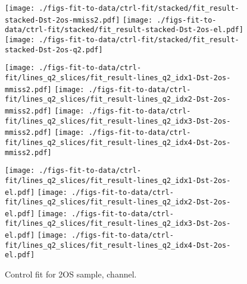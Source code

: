 \begin{figure}[htb]
    \centering
    \texttt{[image: ./figs-fit-to-data/ctrl-fit/stacked/fit\_result-stacked-Dst-2os-mmiss2.pdf]}
    \texttt{[image: ./figs-fit-to-data/ctrl-fit/stacked/fit\_result-stacked-Dst-2os-el.pdf]}
    \texttt{[image: ./figs-fit-to-data/ctrl-fit/stacked/fit\_result-stacked-Dst-2os-q2.pdf]}

    \texttt{[image: ./figs-fit-to-data/ctrl-fit/lines\_q2\_slices/fit\_result-lines\_q2\_idx1-Dst-2os-mmiss2.pdf]}
    \texttt{[image: ./figs-fit-to-data/ctrl-fit/lines\_q2\_slices/fit\_result-lines\_q2\_idx2-Dst-2os-mmiss2.pdf]}
    \texttt{[image: ./figs-fit-to-data/ctrl-fit/lines\_q2\_slices/fit\_result-lines\_q2\_idx3-Dst-2os-mmiss2.pdf]}
    \texttt{[image: ./figs-fit-to-data/ctrl-fit/lines\_q2\_slices/fit\_result-lines\_q2\_idx4-Dst-2os-mmiss2.pdf]}

    \texttt{[image: ./figs-fit-to-data/ctrl-fit/lines\_q2\_slices/fit\_result-lines\_q2\_idx1-Dst-2os-el.pdf]}
    \texttt{[image: ./figs-fit-to-data/ctrl-fit/lines\_q2\_slices/fit\_result-lines\_q2\_idx2-Dst-2os-el.pdf]}
    \texttt{[image: ./figs-fit-to-data/ctrl-fit/lines\_q2\_slices/fit\_result-lines\_q2\_idx3-Dst-2os-el.pdf]}
    \texttt{[image: ./figs-fit-to-data/ctrl-fit/lines\_q2\_slices/fit\_result-lines\_q2\_idx4-Dst-2os-el.pdf]}

    \caption{Control fit for 2OS sample, \Dstar channel.}
    \label{fig:ctrl-2os-dst}
\end{figure}

